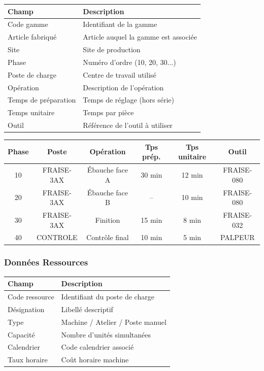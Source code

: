 \documentclass{article}
\begin{document}
\begin{table}[h]
\begin{table}[h]
\centering
\begin{tabular}{|p{}|p{}|}
\hline
\textbf{Champ} & \textbf{Description} \\
\hline
Code gamme & Identifiant de la gamme \\
Article fabriqué & Article auquel la gamme est associée \\
Site & Site de production \\
Phase & Numéro d'ordre (10, 20, 30...) \\
Poste de charge & Centre de travail utilisé \\
Opération & Description de l'opération \\
Temps de préparation & Temps de réglage (hors série) \\
Temps unitaire & Temps par pièce \\
Outil & Référence de l'outil à utiliser \\
\hline
\end{tabular}
\end{table}

\begin{tcolorbox}[colback=vertclair, colframe=green!50!black, title=Exemple : Gamme d'usinage - Fraisage]
\begin{tabular}{|c|c|c|c|c|c|}
\hline
\textbf{Phase} & \textbf{Poste} & \textbf{Opération} & \textbf{Tps prép.} & \textbf{Tps unitaire} & \textbf{Outil} \\
\hline
10 & FRAISE-3AX & Ébauche face A & 30 min & 12 min & FRAISE-080 \\
20 & FRAISE-3AX & Ébauche face B & -- & 10 min & FRAISE-080 \\
30 & FRAISE-3AX & Finition & 15 min & 8 min & FRAISE-032 \\
40 & CONTROLE & Contrôle final & 10 min & 5 min & PALPEUR \\
\hline
\end{tabular}
\end{tcolorbox}

\subsubsection{Données Ressources}

\begin{table}[h]
\centering
\begin{tabular}{|p{}|p{}|}
\hline
\textbf{Champ} & \textbf{Description} \\
\hline
Code ressource & Identifiant du poste de charge \\
Désignation & Libellé descriptif \\
Type & Machine / Atelier / Poste manuel \\
Capacité & Nombre d'unités simultanées \\
Calendrier & Code calendrier associé \\
Taux horaire & Coût horaire machine \\
\hline
\end{tabular}
\end{table}


\end{table}
\end{document}
